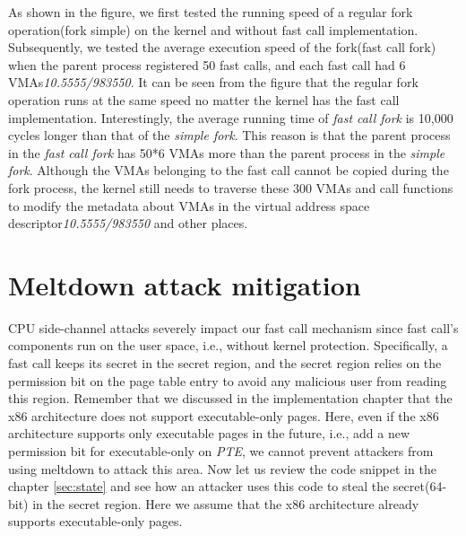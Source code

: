 As shown in the figure, we first tested the running speed of a 
regular fork operation(fork simple) on the kernel  
and without fast call implementation. Subsequently, we tested the 
average execution speed of the fork(fast call fork) when the parent process registered 
50 fast calls, and each fast call had 6 VMAs\emph{10.5555/983550}. It can be seen from the 
figure that the regular fork operation runs at the same speed no matter 
the kernel has the fast call implementation. 
Interestingly, the average running time of \emph{fast call fork} is 10,000 cycles 
longer than that of the \emph{simple fork}. This reason is that the parent process 
in the \emph{fast call fork} has 50*6 VMAs more than the parent process in the \emph{simple fork}. 
Although the VMAs belonging to the fast call cannot be copied during the 
fork process, the kernel still needs to traverse these 300 VMAs and call 
functions to modify the metadata about VMAs in the virtual address 
space descriptor\emph{10.5555/983550} and other places.


\section{Meltdown attack mitigation}

CPU side-channel attacks\cite{3,4} severely impact our fast call 
mechanism since fast call's components run on the user space, 
i.e., without kernel protection. Specifically, a fast call keeps its secret 
in the secret region, and the secret region relies on the permission bit on 
the page table entry to avoid any malicious user from reading this region. 
Remember that we discussed in the implementation chapter that the x86 architecture does not 
support executable-only pages.  Here, even if the x86 architecture supports 
only executable pages in the future, i.e., add a new permission bit for 
executable-only on \emph{PTE}\cite{25},  we cannot prevent attackers from using meltdown to 
attack this area. Now let us review the code snippet in the chapter \ref{sec:state} and see how an attacker uses this code to steal the secret(64-bit) in the 
secret region. Here we assume that the x86 architecture already supports 
executable-only pages.

